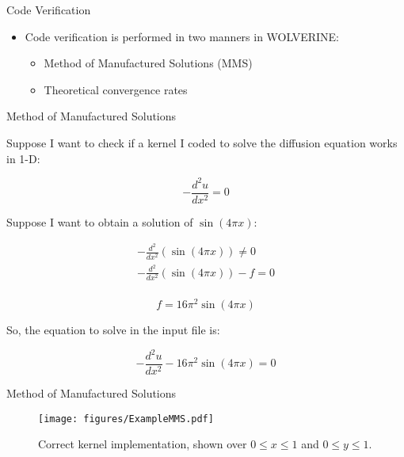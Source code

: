 \documentclass{beamer}
\begin{document}

\begin{frame}{Code Verification}

\begin{itemize}
\item Code verification is performed in two manners in WOLVERINE:
	\begin{itemize}
		\item Method of Manufactured Solutions (MMS)
		\item Theoretical convergence rates
	\end{itemize}
\end{itemize}

\end{frame}


\begin{frame}{Method of Manufactured Solutions}

Suppose I want to check if a kernel I coded to solve the diffusion equation works in 1-D:

\begin{equation}
-\frac{d^2 u}{dx^2}=0
\end{equation}

Suppose I want to obtain a solution of \(\sin{(4\pi x)}\):

\begin{equation}
\begin{aligned}
-\frac{d^2}{dx^2}(\sin{(4\pi x)})\neq 0\\
-\frac{d^2}{dx^2}(\sin{(4\pi x)})-f= 0\\
\end{aligned}
\end{equation}

\begin{equation}
f=16\pi^2\sin{(4\pi x)}
\end{equation}

So, the equation to solve in the input file is:

\begin{equation}
-\frac{d^2u}{dx^2}-16\pi^2\sin{(4\pi x)}= 0
\end{equation}

\end{frame}


\begin{frame}{Method of Manufactured Solutions}

\begin{figure}[H]
\centering
\texttt{[image: figures/ExampleMMS.pdf]}
\caption{Correct kernel implementation, shown over \(0\leq x\leq 1\) and \(0\leq y \leq 1\).}
\end{figure}

\end{frame}
\end{document}
